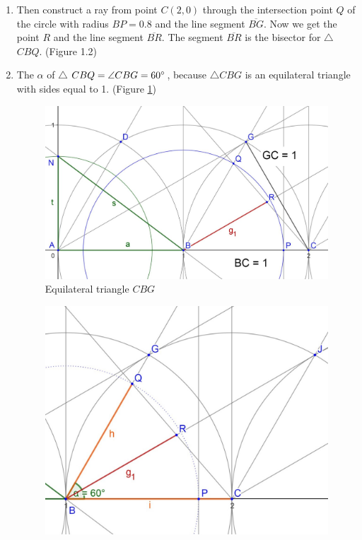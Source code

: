 \documentclass[12pt, letterpaper, oneside]{report}
\begin{document}
\begin{enumerate}
	\item Then construct a ray from point $C(2,0)$ through the intersection point $Q$ of the circle with radius $BP=0.8$ and the line segment $\overline{BG}$.
	\subitem Now we get the point $R$ and the line segment $\overline{BR}$. The segment $\overline{BR}$ is the bisector for $\triangle$ $CBQ$. (Figure 1.2)
	\item The \angle \textit{$\alpha$} of $\triangle$ $CBQ=\angle CBG=60\degree$, because $\triangle CBG$ is an equilateral triangle with sides equal to 1. (Figure \ref{fig:unit triangle})
\begin{figure}[H]
		\centerline{\includegraphics[scale=0.9]{cbg.jpg}}
		\caption{Equilateral triangle $CBG$}
		\label{fig:unit triangle}
\end{figure} 
\newpage
\begin{figure}[h]
	\centerline{\includegraphics[scale=0.9]{bisector0.jpg}}

\end{figure}
\end{enumerate}
\end{document}

